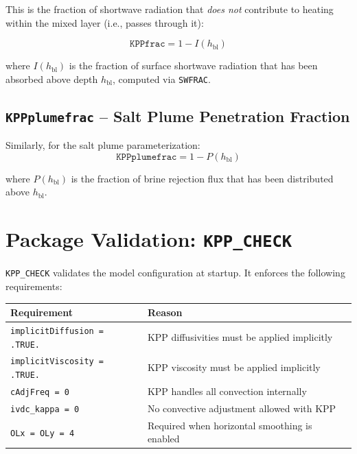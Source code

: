 \documentclass[12pt,letterpaper]{article}
\newcommand{\hbl}{h_{\mathrm{bl}}}
\begin{document}
This is the fraction of shortwave radiation that \textit{does not}  
contribute to heating within the mixed layer (i.e., passes through it):  
  
\begin{equation}  
\texttt{KPPfrac} = 1 - I(\hbl)  
\end{equation}  
  
where $I(\hbl)$ is the fraction of surface shortwave radiation that  
has been absorbed above depth $\hbl$, computed via \texttt{SWFRAC}.  
  
\subsection{\texttt{KPPplumefrac} -- Salt Plume Penetration Fraction}  
  
Similarly, for the salt plume parameterization:  
\begin{equation}  
\texttt{KPPplumefrac} = 1 - P(\hbl)  
\end{equation}  
  
where $P(\hbl)$ is the fraction of brine rejection flux that has been  
distributed above $\hbl$.  
  
\section{Package Validation: \texttt{KPP\_CHECK}}  
  
\texttt{KPP\_CHECK} validates the model configuration at startup.  
It enforces the following requirements:  
  
\begin{longtable}{ll}  
\toprule  
\textbf{Requirement} & \textbf{Reason} \\  
\midrule  
\endhead  
\texttt{implicitDiffusion = .TRUE.} &  
  KPP diffusivities must be applied implicitly \\  
\texttt{implicitViscosity = .TRUE.} &  
  KPP viscosity must be applied implicitly \\  
\texttt{cAdjFreq = 0} &  
  KPP handles all convection internally \\  
\texttt{ivdc\_kappa = 0} &  
  No convective adjustment allowed with KPP \\  
\texttt{OLx = OLy = 4} &  
  Required when horizontal smoothing is enabled \\  
\bottomrule  
\end{longtable}  
  
\end{document}
